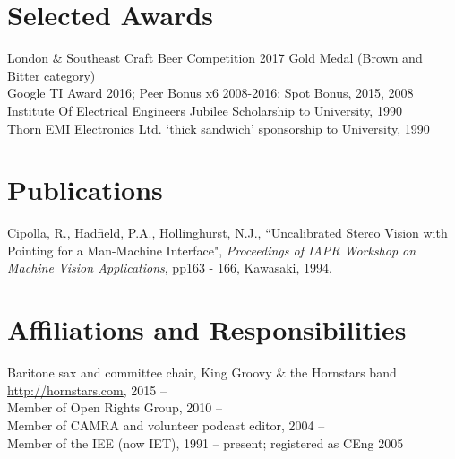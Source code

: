 \documentclass[line]{resume}
\begin{document}
\begin{resume}
    \section{\mysidestyle Selected Awards}

    London \& Southeast Craft Beer Competition 2017 Gold Medal (Brown and Bitter category)            \vspace{0.5mm}\\%
    Google TI Award 2016; Peer Bonus x6 2008-2016; Spot Bonus, 2015, 2008                             \vspace{0.5mm}\\%
    Institute Of Electrical Engineers Jubilee Scholarship to University, 1990                         \vspace{0.5mm}\\%
    Thorn EMI Electronics Ltd. `thick sandwich' sponsorship to University, 1990

    \section{\mysidestyle Publications}

    Cipolla, R., Hadfield, P.A., Hollinghurst, N.J.,
    ``Uncalibrated Stereo Vision with Pointing for a Man-Machine Interface",
    \textsl{Proceedings of IAPR Workshop on Machine Vision Applications}, pp163 - 166, Kawasaki, 1994.

    \section{\mysidestyle Affiliations and Responsibilities}

    Baritone sax and committee chair, King Groovy \& the Hornstars band \url{http://hornstars.com}, 2015 -- \vspace{0.5mm}\\%
    Member of Open Rights Group, 2010 --                                                              \vspace{0.5mm}\\%
    Member of CAMRA and volunteer podcast editor, 2004 --                                                                          \vspace{0.5mm}\\%
    Member of the IEE (now IET), 1991 -- present; registered as CEng 2005


\end{resume}
\end{document}

